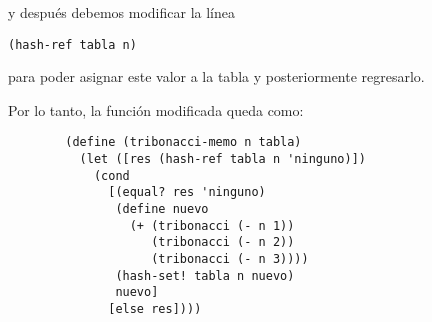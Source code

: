 \documentclass[letterpaper,11pt]{article}
\begin{document}
\begin{enumerate}
\begin{enumerate}
        y después debemos modificar la línea
        \begin{center}
            \texttt{(hash-ref tabla n)}
        \end{center}

        para poder asignar este valor a la tabla y posteriormente regresarlo.
        
        Por lo tanto, la función modificada queda como:
        \begin{verbatim}
        (define (tribonacci-memo n tabla)
          (let ([res (hash-ref tabla n 'ninguno)])
            (cond
              [(equal? res 'ninguno)
               (define nuevo
                 (+ (tribonacci (- n 1)) 
                    (tribonacci (- n 2)) 
                    (tribonacci (- n 3))))
               (hash-set! tabla n nuevo)
               nuevo]
              [else res])))
        \end{verbatim}
    \end{enumerate}

\end{enumerate}
\end{document}
